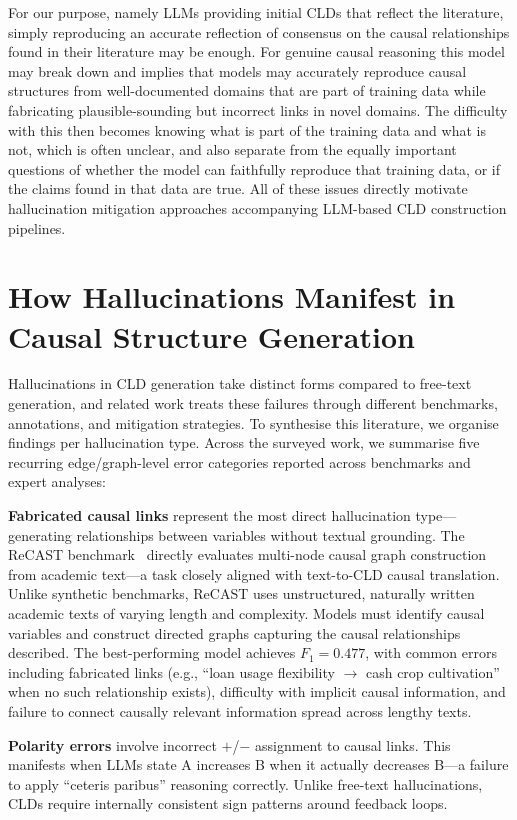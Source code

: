 For our purpose, namely LLMs providing initial CLDs that reflect the literature, simply reproducing an accurate reflection of consensus on the causal relationships found in their literature may be enough. For genuine causal reasoning this model may break down and implies that models may accurately reproduce causal structures from well-documented domains that are part of training data while fabricating plausible-sounding but incorrect links in novel domains. The difficulty with this then becomes knowing what is part of the training data and what is not, which is often unclear, and also separate from the equally important questions of whether the model can faithfully reproduce that training data, or if the claims found in that data are true. All of these issues directly motivate hallucination mitigation approaches accompanying LLM-based CLD construction pipelines.

\section{How Hallucinations Manifest in Causal Structure Generation}

Hallucinations in CLD generation take distinct forms compared to free-text generation, and related work treats these failures through different benchmarks, annotations, and mitigation strategies. To synthesise this literature, we organise findings per hallucination type. Across the surveyed work, we summarise five recurring edge/graph-level error categories reported across benchmarks and expert analyses:

\textbf{Fabricated causal links} represent the most direct hallucination type---generating relationships between variables without textual grounding. The ReCAST benchmark~\citep{recast2025} directly evaluates multi-node causal graph construction from academic text---a task closely aligned with text-to-CLD causal translation. Unlike synthetic benchmarks, ReCAST uses unstructured, naturally written academic texts of varying length and complexity. Models must identify causal variables and construct directed graphs capturing the causal relationships described. The best-performing model achieves $F_1 = 0.477$, with common errors including fabricated links (e.g., ``loan usage flexibility $\rightarrow$ cash crop cultivation'' when no such relationship exists), difficulty with implicit causal information, and failure to connect causally relevant information spread across lengthy texts.

\textbf{Polarity errors} involve incorrect $+$/$-$ assignment to causal links. This manifests when LLMs state A increases B when it actually decreases B---a failure to apply ``ceteris paribus'' reasoning correctly. Unlike free-text hallucinations, CLDs require internally consistent sign patterns around feedback loops.

